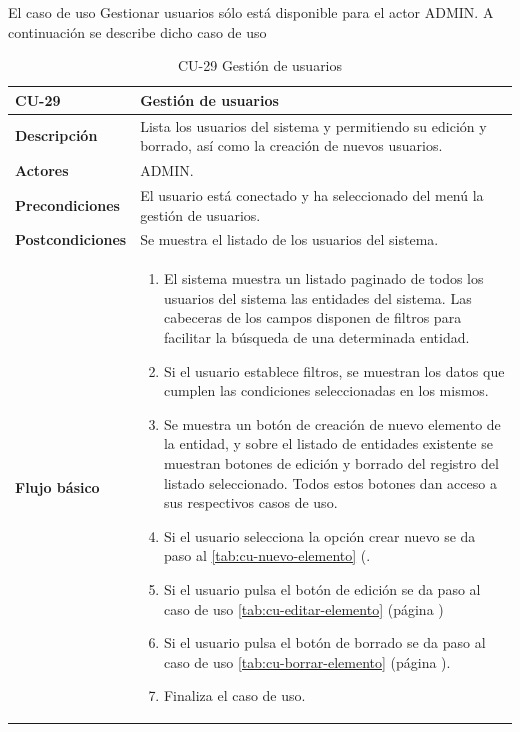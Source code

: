 El caso de uso Gestionar usuarios sólo está disponible para el actor ADMIN. A continuación se describe dicho caso de uso



\begin{table} [H]
    \centering
    \setlength{\leftmargini}{0.4cm}
	\resizebox{14cm}{!} { %
    \begin{tabular}{| m{3cm} | m{11cm} |}   
    \hline
	  \textbf{CU-29} & \textbf{Gestión de usuarios} \\\hline
	  \textbf{Descripción} & Lista los usuarios del sistema y permitiendo su edición y borrado, así como la creación de nuevos usuarios. \\\hline
	  \textbf{Actores} & ADMIN. \\\hline
	  \textbf{Precondiciones} & El usuario está conectado y ha seleccionado del menú la gestión de usuarios. \\\hline
	  \textbf{Postcondiciones} & Se muestra el listado de los usuarios del sistema. \\\hline
	  \textbf{Flujo básico} & 
		\begin{enumerate}
	  	\item El sistema muestra un listado paginado de todos los usuarios del sistema las entidades del sistema. Las cabeceras de los campos disponen de filtros para facilitar la búsqueda de una determinada entidad.
		\item Si el usuario establece filtros, se muestran los datos que cumplen las condiciones seleccionadas en los mismos.
		\item Se muestra un botón de creación de nuevo elemento de la entidad, y sobre el listado de entidades existente se muestran botones de edición y borrado del registro del listado seleccionado. Todos estos botones dan acceso a sus respectivos casos de uso.
		\item Si el usuario selecciona la opción crear nuevo se da paso al \ref{tab:cu-nuevo-elemento} (\pageref{tab:cu-nuevo-elemento}.
		\item Si el usuario pulsa el botón de edición se da paso al caso de uso \ref{tab:cu-editar-elemento} (página \pageref{tab:cu-editar-elemento})
		\item Si el usuario pulsa el botón de borrado se da paso al caso de uso \ref{tab:cu-borrar-elemento} (página \pageref{tab:cu-borrar-elemento}).		  
		\item Finaliza el caso de uso.		
	  \end{enumerate} 	  	  
	  \\\hline
    \end{tabular}
    } %
    \caption{CU-29 Gestión de usuarios}
    \label{tab:cu-gestión-usuarios}
\end{table}



